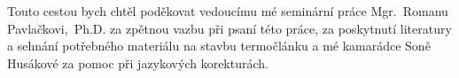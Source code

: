 Touto cestou bych chtěl poděkovat vedoucímu mé seminární práce Mgr.~Romanu
Pav\-lač\-kovi,~Ph.D. za zpětnou vazbu při psaní této práce, za poskytnutí
literatury a sehnání potřebného materiálu na stavbu termočlánku a mé kamarádce
Soně Husákové za pomoc při jazykových korekturách.
\vspace{1cm}
